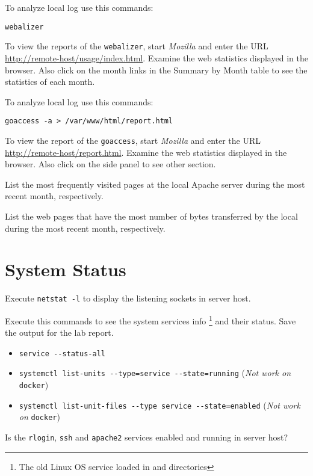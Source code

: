 \documentclass{../UTNetLab}
\begin{document}
    To analyze local log use this commands:
    \begin{lstlisting}
webalizer
    \end{lstlisting}
    
    To view the reports of the \lstinline{webalizer}, start \textit{Mozilla} and enter the URL \url{http://remote-host/usage/index.html}.
    Examine the web statistics displayed in the browser.
    Also click on the month links in the Summary by Month table to see the statistics of each month.

    To analyze local log use this commands:
    \begin{lstlisting}
goaccess -a > /var/www/html/report.html
    \end{lstlisting}
    
    To view the report of the \lstinline{goaccess}, start \textit{Mozilla} and enter the URL \url{http://remote-host/report.html}.
    Examine the web statistics displayed in the browser.
    Also click on the side panel to see other section.

    \begin{report}
        \item List the most frequently visited pages at the local Apache server during the most recent month, respectively.
        
        \item List the web pages that have the most number of bytes transferred by the local during the most recent month, respectively.
    \end{report}

\section{System Status}
    Execute \lstinline{netstat -l} to display the listening sockets in server host.

    Execute this commands to see the system services info \footnote{The old Linux OS service loaded in and  directories} and their status.
    Save the output for the lab report.
    \begin{itemize}
        \item \lstinline{service --status-all}
        \item \lstinline[morekeywords={[2]list-units}]{systemctl list-units --type=service --state=running} (\textit{Not work on} \lstinline{docker})
        \item \lstinline[morekeywords={[2]list-unit-files}]{systemctl list-unit-files --type service --state=enabled} (\textit{Not work on} \lstinline{docker})
    \end{itemize}
    
    \begin{report}
        \item Is the \lstinline{rlogin}, \lstinline{ssh} and \lstinline{apache2} services enabled and running in server host?
    \end{report}
\end{document}
